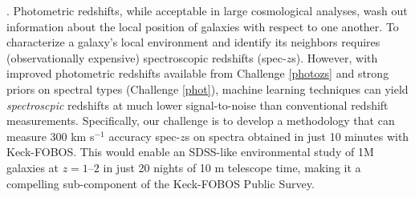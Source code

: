 \documentclass[oneside,11pt]{amsart}
\newcounter{chalno}
\newcommand{\chal}[1]{\refstepcounter{chalno}\label{#1}}
\begin{document}
\medskip
%
\chal{lowsnr}
%
.  Photometric
redshifts, while acceptable in large cosmological analyses, wash out
information about the local position of galaxies with respect to one
another.  To characterize a galaxy's local environment and identify its
neighbors requires (observationally expensive) spectroscopic redshifts
(spec-$z$s).  However, with improved photometric redshifts available
from Challenge \ref{photozs} and strong priors on spectral types
(Challenge \ref{phot}), machine learning techniques can yield
\emph{spectroscpic} redshifts at much lower signal-to-noise than
conventional redshift measurements. Specifically, our challenge is to
develop a methodology that can measure 300 km s$^{-1}$ accuracy
spec-$z$s on spectra obtained in just 10 minutes with Keck-FOBOS.  This
would enable an SDSS-like environmental study of 1M galaxies at
$z=1$--$2$ in just 20 nights of 10 m telescope time, making it a
compelling sub-component of the Keck-FOBOS Public Survey.








\end{document}
